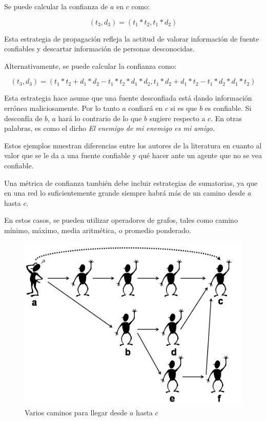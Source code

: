 Se puede calcular la confianza de $a$ en $c$ como:

\begin{equation}
(t_3,d_3) = (t_1 * t_2, t_1*d_2)
\end{equation}

Esta estrategia de propagación refleja la actitud de valorar información de fuente confiables y descartar información de personas desconocidas.

Alternativamente, se puede calcular la confianza como: 

\begin{equation}
(t_3,d_3) = (t_1*t_2+d_1*d_2-t_1*t_2*d_1*d_2,t_1*d_2+d_1*t_2-t_1*d_2*d_1*t_2)
\end{equation}

Esta estrategia hace asume que una fuente desconfiada está dando información errónea maliciosamente. Por lo tanto $a$ confiará en $c$ si es que $b$ es confiable. Si desconfía de $b$, $a$ hará lo contrario de lo que $b$ sugiere respecto a $c$. En otras palabras, es como el dicho \textit{El enemigo de mi enemigo es mi amigo.}

Estos ejemplos muestran diferencias entre los autores de la literatura en cuanto al valor que se le da a una fuente confiable y qué hacer ante un agente que no se vea confiable.

Una métrica de confianza también debe incluir estrategias de sumatorias, ya que en una red lo suficientemente grande siempre habrá más de un camino desde $a$ hasta $c$.

En estos casos, se pueden utilizar operadores de grafos, tales como camino mínimo, máximo, media aritmética, o promedio ponderado. 

\begin{figure}[hbtp]
\centering
\includegraphics[scale=0.3]{images/trustaggr.png}
\caption{Varios caminos para llegar desde $a$ hasta $c$}
\end{figure}


